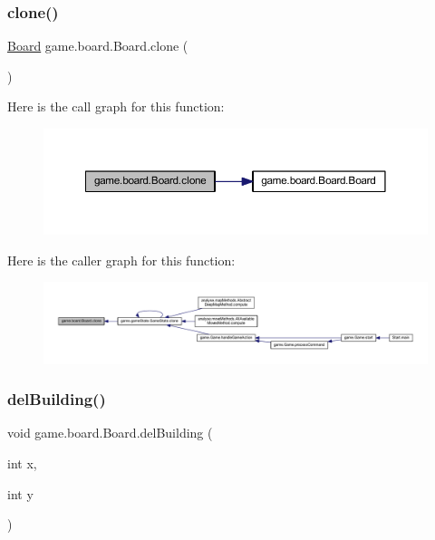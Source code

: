 \subsubsection{\texorpdfstring{clone()}{clone()}}
{\footnotesize\ttfamily \mbox{\hyperlink{classgame_1_1board_1_1_board}{Board}} game.\+board.\+Board.\+clone (\begin{DoxyParamCaption}{ }\end{DoxyParamCaption})\hspace{0.3cm}{\ttfamily [inline]}}

Here is the call graph for this function\+:
\nopagebreak
\begin{figure}[H]
\begin{center}
\leavevmode
\includegraphics[width=350pt]{classgame_1_1board_1_1_board_a9c451f4c61b310a98999f4d6968bc6e1_cgraph}
\end{center}
\end{figure}
Here is the caller graph for this function\+:
\nopagebreak
\begin{figure}[H]
\begin{center}
\leavevmode
\includegraphics[width=350pt]{classgame_1_1board_1_1_board_a9c451f4c61b310a98999f4d6968bc6e1_icgraph}
\end{center}
\end{figure}
\mbox{\label{classgame_1_1board_1_1_board_a2887ad41696ae6aeafc9494ca80f465b}} 
\subsubsection{\texorpdfstring{del\+Building()}{delBuilding()}}
{\footnotesize\ttfamily void game.\+board.\+Board.\+del\+Building (\begin{DoxyParamCaption}\item[{int}]{x,  }\item[{int}]{y }\end{DoxyParamCaption})\hspace{0.3cm}{\ttfamily [inline]}}


